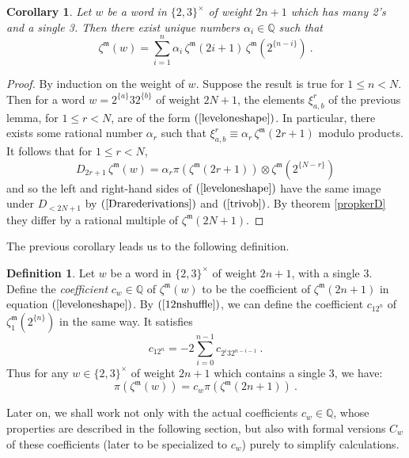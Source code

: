 \documentclass[10pt]{amsart}
\newtheorem{cor}[thm]{Corollary}
\theoremstyle{definition}
\newtheorem{defn}[thm]{Definition}
\theoremstyle{remark}
\numberwithin{equation}{section}
\newcommand{\zetam}{\zeta^{ \mathfrak{m}}}
\newcommand{\Q}{\mathbb Q}
\begin{document}
\begin{cor} \label{corlevel1} Let $w$ be a word in $\{2,3\}^{\times}$ of weight $2n+1$ which has many 2's and a single 3.  Then
there exist unique numbers $\alpha_i \in \Q$ such that
\begin{equation}\label{leveloneshape} 
 \zetam(w) = \sum_{i=1}^{n} \alpha_i\,  \zetam(2i+1) \, \zetam(2^{\{n-i\}}) \ . 
\end{equation}
\end{cor}
\begin{proof} By induction on the weight of $w$. Suppose the result is true for $1\leq n< N$. Then for  a word $w=2^{\{a\}}32^{\{b\}}$ of weight $2N+1$, the elements $\xi^r_{a,b}$ of the previous lemma, for $1\leq r<N$,  are of the form $(\ref{leveloneshape})$. In particular, there exists some rational number $\alpha_r$ such that  $\xi^r_{a,b} \equiv \alpha_r\,  \zetam(2r+1)$ modulo products.
 It follows that for $1\leq r < N$, 
 $$D_{2r+1}\, \zetam(w) = \alpha_r \pi(\zetam(2r+1)) \otimes \zetam(2^{\{N-r\}})$$
and so the left and right-hand sides of
  $(\ref{leveloneshape})$ have the same image under $D_{<2N+1}$ by $(\ref{Drarederivations})$ and $(\ref{trivob})$.
By theorem \ref{propkerD} they differ by  a rational multiple of $\zetam(2N+1)$.
\end{proof}

The previous corollary leads us to the following definition.
\begin{defn} Let $w$ be a word in $\{2,3\}^{\times}$ of weight $2n+1$, with a single $3$. Define the \emph{coefficient} $c_w \in \Q$   of $\zetam(w)$
to be the coefficient of $\zetam(2n+1)$ in equation $(\ref{leveloneshape})$.
By $(\ref{12nshuffle})$, we can define  the coefficient $c_{12^n}$ of  $\zetam_1(2^{\{n\}})$ in the same way. It satisfies
\begin{equation} \label{c12id} c_{12^n}=-2 \sum_{i=0}^{n-1}  c_{2^{i}32^{n-i-1}}  \ .   \end{equation}
Thus for any $w \in \{2, 3\}^{\times}$ of weight $2n+1$ which contains a single 3,  we have:
\begin{equation} \label{pizetaw}
\pi(\zetam(w)) = c_{w} \pi(\zetam(2n+1) )  \ . 
\end{equation}
\end{defn}


Later on, we shall work not only with the actual coefficients $c_w\in \Q$, whose properties are described in the following section, but also with 
formal versions $C_w$ of these coefficients  (later to be specialized to $c_w$) purely  to simplify calculations.
\end{document}
